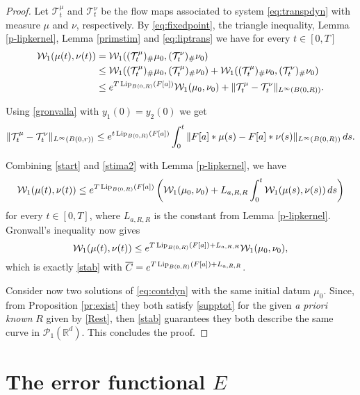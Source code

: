 \documentclass[A4paper,11pt]{article}
\theoremstyle{definition}
\newcommand{\Lip}{\textup{Lip}}
\newcommand{\R}{\mathbb{R}}
\newcommand{\W}{\mathcal{W}}
\newcommand{\PP}{\mathcal{P}_1}
\begin{document}
\begin{proof}
Let  ${\mathcal T}^\mu_t$ and ${\mathcal T}^\nu_t$ be the flow maps associated to system \eqref{eq:transpdyn} with measure $\mu$ and $\nu$, respectively.
By \eqref{eq:fixedpoint}, the triangle inequality, Lemma \ref{p-lipkernel}, Lemma \ref{primstim} and \eqref{eq:liptrans} we have for every $t \in [0,T]$
\begin{align}
\begin{split}\label{start}
\W_1(\mu(t), \nu(t))&=\W_1(({\mathcal T}^\mu_t)_{\#} \mu_0, ({\mathcal T}^\nu_t)_{\#} \nu_0)  \\
&\le \W_1(({\mathcal T}^\mu_t)_{\#} \mu_0, ({\mathcal T}^\mu_t)_{\#} \nu_0) + \W_1(({\mathcal T}^\mu_t)_{\#} \nu_0, ({\mathcal T}^\nu_t)_{\#} \nu_0)\\
&\le e^{T \, \Lip_{B(0,R)}(F[a])} \W_1(\mu_0, \nu_0)+\|{\mathcal T}^\mu_t-{\mathcal T}^\nu_t\|_{L^\infty(B(0,R))}.
\end{split}
\end{align}

Using \eqref{gronvalla} with $y_1(0)= y_2(0)$ we get
\begin{equation}\label{stima2}
\|{\mathcal T}^\mu_t-{\mathcal T}^\nu_t\|_{L^\infty(B(0,r))}\le e^{t \, \Lip_{B(0,R)}(F[a])}\int_0^t \|F[a]* \mu(s)-F[a]* \nu(s)\|_{L^\infty(B(0,R))}\,ds.
\end{equation}

Combining \eqref{start} and \eqref{stima2} with Lemma \ref{p-lipkernel}, we have
$$
\W_1(\mu(t), \nu(t))\le e^{T \, \Lip_{B(0,R)}(F[a])} \left(\W_1(\mu_0, \nu_0)+ L_{a,R,R}\int_0^t \W_1(\mu(s), \nu(s)) \,ds\right)
$$
for every $t \in [0, T]$, where $L_{a,R,R}$ is the constant from Lemma \ref{p-lipkernel}. Gronwall's inequality now gives
$$
\W_1(\mu(t), \nu(t))\le e^{T \, \Lip_{B(0,R)}(F[a]) + L_{a,R,R}} \W_1(\mu_0, \nu_0),
$$
which is exactly \eqref{stab} with $\overline{C}= e^{T \, \Lip_{B(0,R)}(F[a]) + L_{a,R,R}}$.

Consider now two solutions of \eqref{eq:contdyn} with the same initial datum $\mu_0$. Since, from Proposition \ref{pr:exist} they both satisfy \eqref{supptot} for the given \textit{a priori known} $R$ given by \eqref{Rest}, then \eqref{stab} guarantees they both describe the same curve in $\PP(\R^d)$. This concludes the proof.
\end{proof}

\section{The error functional $E$}
\end{document}
